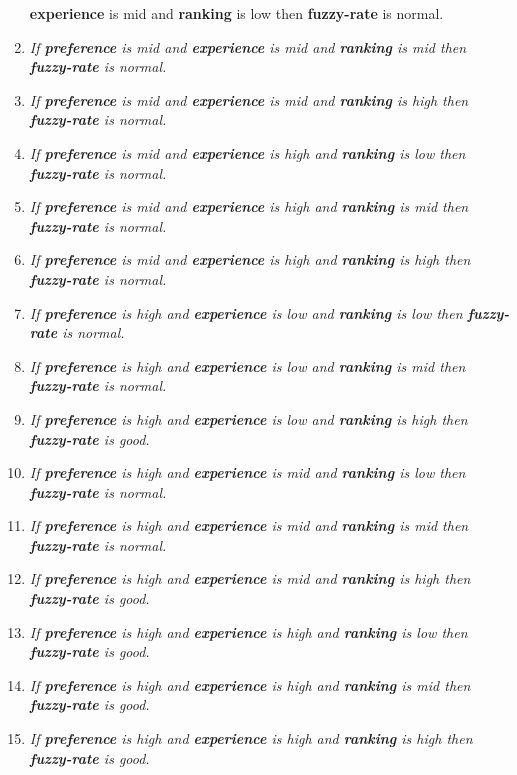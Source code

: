 \begin{enumerate}
{		\textbf{experience} is mid and \textbf{ranking} is low then \textbf{fuzzy-rate} is normal.}
	\item \textit{If \textbf{preference} is mid and 
		\textbf{experience} is mid and \textbf{ranking} is mid then \textbf{fuzzy-rate} is normal.}
	\item \textit{If \textbf{preference} is mid and 
		\textbf{experience} is mid and \textbf{ranking} is high then \textbf{fuzzy-rate} is normal.}
	\item \textit{If \textbf{preference} is mid and 
		\textbf{experience} is high and \textbf{ranking} is low then \textbf{fuzzy-rate} is normal.}
	\item \textit{If \textbf{preference} is mid and 
		\textbf{experience} is high and \textbf{ranking} is mid then \textbf{fuzzy-rate} is normal.}
	\item \textit{If \textbf{preference} is mid and 
		\textbf{experience} is high and \textbf{ranking} is high then \textbf{fuzzy-rate} is normal.}
	\item \textit{If \textbf{preference} is high and 
		\textbf{experience} is low and \textbf{ranking} is low then \textbf{fuzzy-rate} is normal.}\
	\item \textit{If \textbf{preference} is high and 
		\textbf{experience} is low and \textbf{ranking} is mid then \textbf{fuzzy-rate} is normal.}\
	\item \textit{If \textbf{preference} is high and 
		\textbf{experience} is low and \textbf{ranking} is high then \textbf{fuzzy-rate} is good.}\
	\item \textit{If \textbf{preference} is high and 
		\textbf{experience} is mid and \textbf{ranking} is low then \textbf{fuzzy-rate} is normal.}\
	\item \textit{If \textbf{preference} is high and 
		\textbf{experience} is mid and \textbf{ranking} is mid then \textbf{fuzzy-rate} is normal.}\
	\item \textit{If \textbf{preference} is high and 
		\textbf{experience} is mid and \textbf{ranking} is high then \textbf{fuzzy-rate} is good.}\
	\item \textit{If \textbf{preference} is high and 
		\textbf{experience} is high and \textbf{ranking} is low then \textbf{fuzzy-rate} is good.}\
	\item \textit{If \textbf{preference} is high and 
		\textbf{experience} is high and \textbf{ranking} is mid then \textbf{fuzzy-rate} is good.}\
	\item \textit{If \textbf{preference} is high and 
		\textbf{experience} is high and \textbf{ranking} is high then \textbf{fuzzy-rate} is good.}\
	
\end{enumerate} 


















